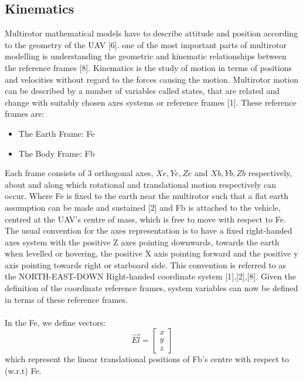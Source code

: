 \documentclass[12pt,a4paper,twoside]{report}
\begin{document}
			\subsection{Kinematics}
			
				Multirotor mathematical models have to describe attitude and position according to the geometry of the UAV [6]. one of the most important parts of multirotor modelling is understanding the geometric and kinematic relationships between the reference frames [8]. Kinematics is the study of motion in terms of positions and velocities without regard to the forces causing the motion. Multirotor motion can be described by a number of variables called states, that are related and change with suitably chosen axes systems or reference frames [1]. These reference frames are:
				
				\begin{itemize}
					\item
						The Earth Frame: Fe
					\item 
						The Body Frame: Fb  
				\end{itemize}
				\space
				Each frame consists of 3 orthogonal axes, \(Xe,Ye,Ze\) and \(Xb,Yb,Zb\) respectively, about and along which rotational and translational motion respectively can occur. Where Fe is fixed to the earth near the multirotor such that a flat earth assumption can be made and sustained [2] and Fb is attached to the vehicle, centred at the UAV’s centre of mass, which is free to move with respect to Fe. The usual convention for the axes representation is to have a fixed right-handed axes system with the positive Z axes pointing downwards, towards the earth when levelled or hovering, the positive X axis pointing forward and the positive y axis pointing towards right or starboard side. This convention is referred to as the NORTH-EAST-DOWN Right-handed coordinate system [1],[2],[8]. Given the definition of the coordinate reference frames, system variables can now be defined in terms of these reference frames.
				\\ \\
				In the Fe, we define vectors:
				\\
				$$
				\vec{El} = 
				\begin{bmatrix}
					x \\
					y \\
					z
				\end{bmatrix}
				$$
				which represent the linear translational positions of Fb’s centre with respect to (w.r.t) Fe.
				\\
\end{document}
